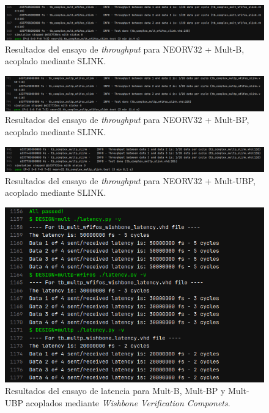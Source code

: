 \begin{figure}[H]
    \centering
    \includegraphics[width=14cm]{Figuras/result/thr2.png}
    \caption{Resultados del ensayo de \textit{throughput} para NEORV32 + Mult-B, acoplado mediante SLINK.}
    \label{fig:thr2}
\end{figure}

\begin{figure}[H]
    \centering
    \includegraphics[width=14cm]{Figuras/result/thr3.png}
    \caption{Resultados del ensayo de \textit{throughput} para NEORV32 + Mult-BP, acoplado mediante SLINK.}
    \label{fig:thr3}
\end{figure}

\begin{figure}[H]
    \centering
    \includegraphics[width=14cm]{Figuras/result/thr4.png}
    \caption{Resultados del ensayo de \textit{throughput} para NEORV32 + Mult-UBP, acoplado mediante SLINK.}
    \label{fig:thr4}
\end{figure}

\begin{figure}[H]
    \centering
    \includegraphics[width=14cm]{Figuras/result/lat5.png}
    \caption{Resultados del ensayo de latencia para Mult-B, Mult-BP y Mult-UBP acoplados mediante \textit{Wishbone Verification Componets}.}
    \label{fig:lat5}
\end{figure}


